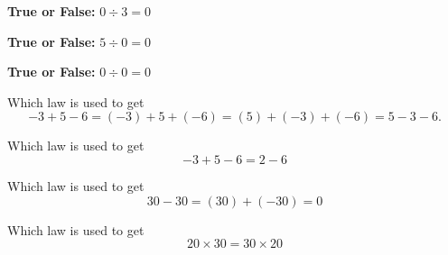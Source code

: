 \documentclass{ximera}
\begin{document}
\begin{problem}
\textbf{True or False:} $0\div 3= 0$ 
\begin{multipleChoice*}
\end{multipleChoice*}
\end{problem}



\begin{problem}
\textbf{True or False:} $5\div 0= 0$ 
\begin{multipleChoice*}
\end{multipleChoice*}
\end{problem}


\begin{problem}
\textbf{True or False:} $0\div 0= 0$ 
\begin{multipleChoice*}
\end{multipleChoice*}
\end{problem}


\begin{problem}
Which law is used to get $$-3+5-6=(-3)+5+(-6)=(5)+(-3)+(-6)=5-3-6.$$ 
\begin{multipleChoice}
\end{multipleChoice}
\end{problem}


\begin{problem}
Which law is used to get $$-3+5-6=2-6$$ 
\begin{multipleChoice}
\end{multipleChoice}
\end{problem}


\begin{problem}
Which law is used to get $$30-30=(30)+(-30)=0$$ 
\begin{multipleChoice}
\end{multipleChoice}
\end{problem}


\begin{problem}
Which law is used to get $$20\times 30=30\times 20$$ 
\begin{multipleChoice}
\end{multipleChoice}
\end{problem}
\end{document}

